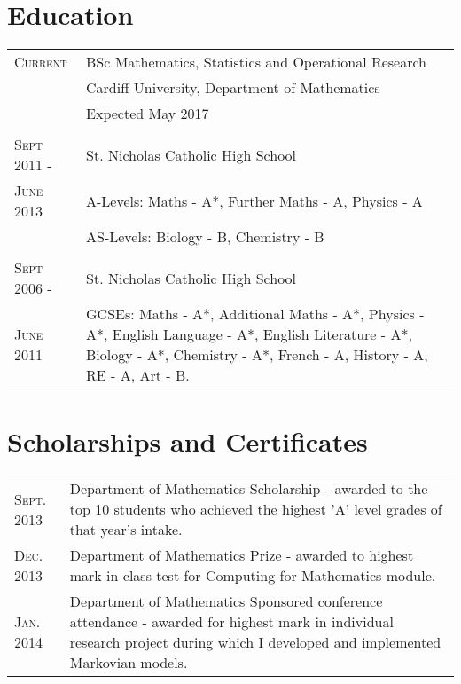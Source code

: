 \documentclass[a4paper]{article}
\begin{document}
\section{Education}
\begin{tabularx}{\textwidth}{lX}

\textsc{Current} & \textsc BSc Mathematics, Statistics and Operational Research \\
&\normalsize Cardiff University, Department of Mathematics\\
& Expected May 2017\\
\\
\textsc{Sept 2011 -} & St. Nicholas Catholic High School\\
\textsc{June 2013} & A-Levels: Maths - A*, Further Maths - A, Physics - A\\
& AS-Levels: Biology - B, Chemistry - B\\
\\
\textsc{Sept 2006 -} & St. Nicholas Catholic High School\\
\textsc{June 2011} & GCSEs: Maths - A*, Additional Maths - A*, Physics - A*, English Language - A*, English Literature - A*, Biology - A*, Chemistry - A*, French - A, History - A, RE - A, Art - B.\\

\end{tabularx}
\section{Scholarships and Certificates}
\begin{tabularx}{\textwidth}{lX}

\textsc{Sept.} 2013 & Department of Mathematics Scholarship - awarded to the top 10 students who achieved the highest 'A' level grades of that year's intake.\\
\textsc{Dec.} 2013 & Department of Mathematics Prize - awarded to highest mark in class test for Computing for Mathematics module.\\
\textsc{Jan.} 2014 & Department of Mathematics Sponsored conference attendance - awarded for highest mark in individual research project during which I developed and implemented Markovian models.\\

\end{tabularx}
\end{document}
